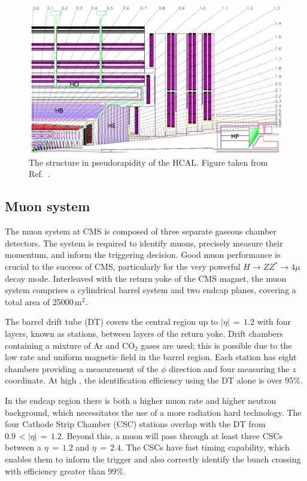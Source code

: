 \begin{figure}[h!]
  \centering
  \includegraphics[width=\textwidth]{Figures/Detector/HCAL.png}
  \caption[The structure in pseudorapidity of the CMS HCAL.]
  {The structure in pseudorapidity of the HCAL.
  Figure taken from Ref.~\cite{CMSdetector}.}
  \label{fig:detector_HCAL}
\end{figure}

\subsection{Muon system}

The muon system at CMS is composed of three separate gaseous chamber detectors.
The system is required to identify muons, precisely measure their momentum, and inform the triggering decision.
Good muon performance is crucial to the success of CMS, particularly for the very powerful $H \rightarrow ZZ^* \rightarrow 4\mu$ decay mode.
Interleaved with the return yoke of the CMS magnet, the muon system comprises a cylindrical barrel system and two endcap planes, 
covering a total area of 25000\,$\textrm{m}^2$.

The barrel drift tube (DT) covers the central region up to $|\eta|\,=\,1.2$ with four layers, known as stations, between layers of the return yoke.
Drift chambers containing a mixture of Ar and $\textrm{CO}_2$ gases are used; this is possible due to the low rate and uniform magnetic field in the barrel region.
Each station has eight chambers providing a measurement of the $\phi$ direction and four measuring the $z$ coordinate.
At high \pt, the identification efficiency using the DT alone is over 95\%.

In the endcap region there is both a higher muon rate and higher neutron background, which necessitates the use of a more radiation hard technology. %
The four Cathode Strip Chamber (CSC) stations overlap with the DT from $0.9\,<|\eta|\,=\,1.2$.
Beyond this, a muon will pass through at least three CSCs between a $\eta\,=\,1.2$ and $\eta\,=\,2.4$.
The CSCs have fast timing capability, which enables them to inform the trigger and also correctly identify the bunch crossing with efficiency greater than 99\%.

